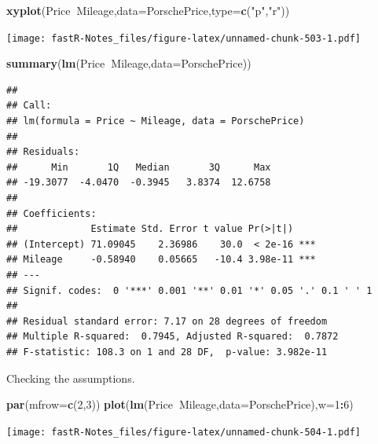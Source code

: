 \documentclass[]{book}
\newenvironment{Shaded}{\begin{snugshade}}{\end{snugshade}}
\newcommand{\KeywordTok}[1]{\textcolor[rgb]{0.13,0.29,0.53}{\textbf{#1}}}
\newcommand{\DataTypeTok}[1]{\textcolor[rgb]{0.13,0.29,0.53}{#1}}
\newcommand{\DecValTok}[1]{\textcolor[rgb]{0.00,0.00,0.81}{#1}}
\newcommand{\StringTok}[1]{\textcolor[rgb]{0.31,0.60,0.02}{#1}}
\newcommand{\OperatorTok}[1]{\textcolor[rgb]{0.81,0.36,0.00}{\textbf{#1}}}
\newcommand{\NormalTok}[1]{#1}
\theoremstyle{definition}
\theoremstyle{definition}
\theoremstyle{definition}
\theoremstyle{remark}
\begin{document}
\begin{Shaded}
\begin{Highlighting}[]
\KeywordTok{xyplot}\NormalTok{(Price}\OperatorTok{~}\NormalTok{Mileage,}\DataTypeTok{data=}\NormalTok{PorschePrice,}\DataTypeTok{type=}\KeywordTok{c}\NormalTok{(}\StringTok{"p"}\NormalTok{,}\StringTok{"r"}\NormalTok{))}
\end{Highlighting}
\end{Shaded}

\texttt{[image: fastR-Notes\_files/figure-latex/unnamed-chunk-503-1.pdf]}

\begin{Shaded}
\begin{Highlighting}[]
\KeywordTok{summary}\NormalTok{(}\KeywordTok{lm}\NormalTok{(Price}\OperatorTok{~}\NormalTok{Mileage,}\DataTypeTok{data=}\NormalTok{PorschePrice))}
\end{Highlighting}
\end{Shaded}

\begin{verbatim}
## 
## Call:
## lm(formula = Price ~ Mileage, data = PorschePrice)
## 
## Residuals:
##      Min       1Q   Median       3Q      Max 
## -19.3077  -4.0470  -0.3945   3.8374  12.6758 
## 
## Coefficients:
##             Estimate Std. Error t value Pr(>|t|)    
## (Intercept) 71.09045    2.36986    30.0  < 2e-16 ***
## Mileage     -0.58940    0.05665   -10.4 3.98e-11 ***
## ---
## Signif. codes:  0 '***' 0.001 '**' 0.01 '*' 0.05 '.' 0.1 ' ' 1
## 
## Residual standard error: 7.17 on 28 degrees of freedom
## Multiple R-squared:  0.7945, Adjusted R-squared:  0.7872 
## F-statistic: 108.3 on 1 and 28 DF,  p-value: 3.982e-11
\end{verbatim}

Checking the assumptions.

\begin{Shaded}
\begin{Highlighting}[]
\KeywordTok{par}\NormalTok{(}\DataTypeTok{mfrow=}\KeywordTok{c}\NormalTok{(}\DecValTok{2}\NormalTok{,}\DecValTok{3}\NormalTok{))}
\KeywordTok{plot}\NormalTok{(}\KeywordTok{lm}\NormalTok{(Price}\OperatorTok{~}\NormalTok{Mileage,}\DataTypeTok{data=}\NormalTok{PorschePrice),}\DataTypeTok{w=}\DecValTok{1}\OperatorTok{:}\DecValTok{6}\NormalTok{)}
\end{Highlighting}
\end{Shaded}

\texttt{[image: fastR-Notes\_files/figure-latex/unnamed-chunk-504-1.pdf]}
\end{document}
